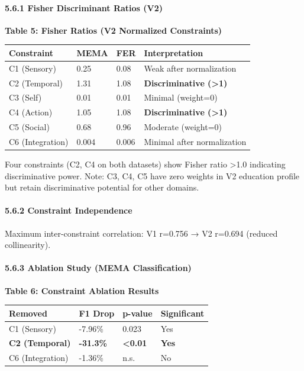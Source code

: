 \documentclass[
]{article}
\newcounter{none} %
\begin{document}
\paragraph{5.6.1 Fisher Discriminant Ratios
(V2)}\label{fisher-discriminant-ratios-v2}

\textbf{Table 5: Fisher Ratios (V2 Normalized Constraints)}

{\def\LTcaptype{none} %
\begin{longtable}[]{@{}llll@{}}
\toprule\noalign{}
Constraint & MEMA & FER & Interpretation \\
\midrule\noalign{}
\endhead
\bottomrule\noalign{}
\endlastfoot
C1 (Sensory) & 0.25 & 0.08 & Weak after normalization \\
C2 (Temporal) & 1.31 & 1.08 & \textbf{Discriminative (\textgreater1)} \\
C3 (Self) & 0.01 & 0.01 & Minimal (weight=0) \\
C4 (Action) & 1.05 & 1.08 & \textbf{Discriminative (\textgreater1)} \\
C5 (Social) & 0.68 & 0.96 & Moderate (weight=0) \\
C6 (Integration) & 0.004 & 0.006 & Minimal after normalization \\
\end{longtable}
}

Four constraints (C2, C4 on both datasets) show Fisher ratio
\textgreater1.0 indicating discriminative power. Note: C3, C4, C5 have
zero weights in V2 education profile but retain discriminative potential
for other domains.

\paragraph{5.6.2 Constraint Independence}\label{constraint-independence}

Maximum inter-constraint correlation: V1 r=0.756 → V2 r=0.694 (reduced
collinearity).

\paragraph{5.6.3 Ablation Study (MEMA
Classification)}\label{ablation-study-mema-classification}

\textbf{Table 6: Constraint Ablation Results}

{\def\LTcaptype{none} %
\begin{longtable}[]{@{}llll@{}}
\toprule\noalign{}
Removed & F1 Drop & p-value & Significant \\
\midrule\noalign{}
\endhead
\bottomrule\noalign{}
\endlastfoot
C1 (Sensory) & -7.96\% & 0.023 & Yes \\
\textbf{C2 (Temporal)} & \textbf{-31.3\%} & \textbf{\textless0.01} &
\textbf{Yes} \\
C6 (Integration) & -1.36\% & n.s. & No \\
\end{longtable}
}
\end{document}
